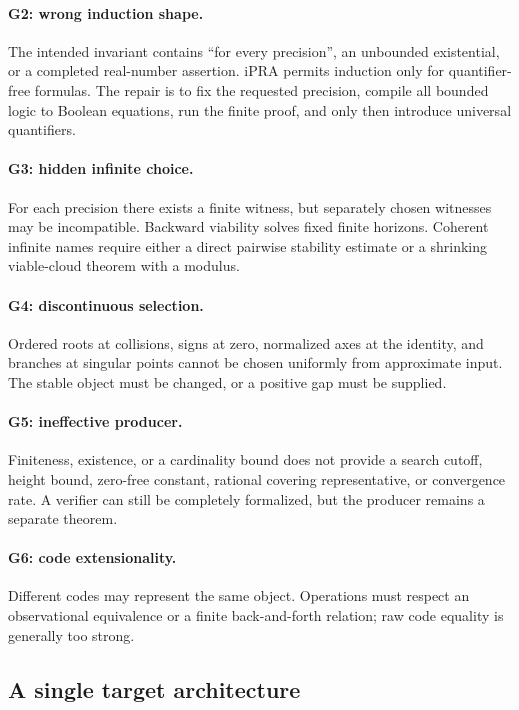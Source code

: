 \paragraph{G2: wrong induction shape.}
The intended invariant contains ``for every precision'', an unbounded
existential, or a completed real-number assertion.  iPRA permits induction only
for quantifier-free formulas.  The repair is to fix the requested precision,
compile all bounded logic to Boolean equations, run the finite proof, and only
then introduce universal quantifiers.

\paragraph{G3: hidden infinite choice.}
For each precision there exists a finite witness, but separately chosen
witnesses may be incompatible.  Backward viability solves fixed finite
horizons.  Coherent infinite names require either a direct pairwise stability
estimate or a shrinking viable-cloud theorem with a modulus.

\paragraph{G4: discontinuous selection.}
Ordered roots at collisions, signs at zero, normalized axes at the identity,
and branches at singular points cannot be chosen uniformly from approximate
input.  The stable object must be changed, or a positive gap must be supplied.

\paragraph{G5: ineffective producer.}
Finiteness, existence, or a cardinality bound does not provide a search cutoff,
height bound, zero-free constant, rational covering representative, or
convergence rate.  A verifier can still be completely formalized, but the
producer remains a separate theorem.

\paragraph{G6: code extensionality.}
Different codes may represent the same object.  Operations must respect an
observational equivalence or a finite back-and-forth relation; raw code equality
is generally too strong.

\subsection{A single target architecture}

